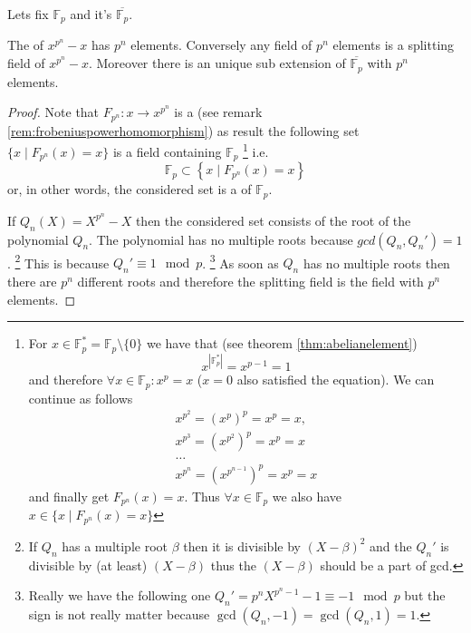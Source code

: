 \begin{theorem}
  Lets fix $\mathbb{F}_p$ and it's 
  $\overline{\mathbb{F}_p}$.

  The  of $x^{p^n} - x$ has $p^n$
  elements. Conversely any field of $p^n$ elements is a splitting
  field of $x^{p^n} - x$. Moreover there is an unique sub extension of
  $\overline{\mathbb{F}_p}$ with $p^n$ elements.
  \begin{proof}
    Note that $F_{p^n} : x \to x^{p^n}$ is a
     (see remark
    \ref{rem:frobeniuspowerhomomorphism}) as result the following set
    $\{
    x \mid F_{p^n}\left(x\right) = x
    \}$ is a field containing $\mathbb{F}_p$
    \footnote{
      For $x \in \mathbb{F}_p^{*} = \mathbb{F}_p \setminus \{0\}$ we
      have that (see theorem \ref{thm:abelianelement})
      \[
      x^{\left|\mathbb{F}_p^{*}\right|} = x^{p-1} = 1
      \]
      and therefore $\forall x \in \mathbb{F}_p: x^p = x$ ($x = 0$
      also satisfied the equation). We can continue as follows
      \begin{eqnarray}
        x^{p^2} = \left(x^p\right)^p = x^p = x,
        \nonumber \\
        x^{p^3} = \left(x^{p^2}\right)^p = x^p = x
        \nonumber \\
        \dots
        \nonumber \\
        x^{p^n} = \left(x^{p^{n-1}}\right)^p = x^p = x
        \nonumber
      \end{eqnarray}
      and finally get
      $F_{p^n}\left(x\right) = x$.
      Thus $\forall x \in \mathbb{F}_p$ we also have
      $x \in \{
      x \mid F_{p^n}\left(x\right) = x
      \}$
    }
    i.e.
    \[
    \mathbb{F}_p \subset
    \left\{
    x \mid F_{p^n}\left(x\right) = x
    \right\}
    \]
    or, in other words, the considered set is a  of
    $\mathbb{F}_p$.
    
    If $Q_n\left(X\right) = X^{p^n} - X$ then the considered set
    consists of the root of the polynomial $Q_n$. The polynomial has
    no multiple roots because $gcd(Q_n, Q_n') = 1$.
    \footnote{
      If $Q_n$ has a multiple root $\beta$ then it is divisible by
      $\left(X - \beta\right)^2$ and the $Q_n'$ is divisible by (at
      least) $\left(X - \beta\right)$ thus the $\left(X -
      \beta\right)$ should be a part of gcd.
    }
    This is because $Q_n' \equiv 1 \mod p$.
    \footnote{
      Really we have the following one $Q_n' = p^n X^{p^n - 1} - 1
      \equiv -1 \mod p$ but the sign is not really matter because
      $\gcd\left(Q_n, -1\right) = \gcd\left(Q_n, 1\right) = 1$. 
    }
    As soon as $Q_n$ has no multiple roots then there are $p^n$
    different roots and therefore the splitting field is the field
    with $p^n$ elements.


\end{proof}
\end{theorem}
